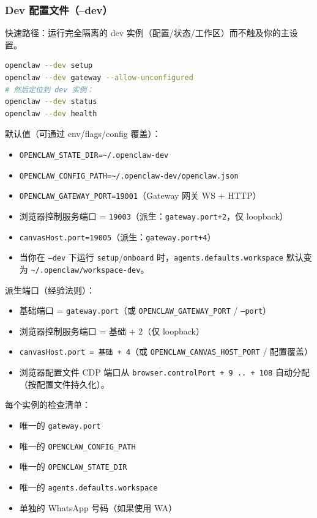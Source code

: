 \subsubsection{Dev 配置文件（--dev）}


快速路径：运行完全隔离的 dev 实例（配置/状态/工作区）而不触及你的主设置。

\begin{lstlisting}[language=bash]
openclaw --dev setup
openclaw --dev gateway --allow-unconfigured
# 然后定位到 dev 实例：
openclaw --dev status
openclaw --dev health
\end{lstlisting}


默认值（可通过 env/flags/config 覆盖）：

\begin{itemize}
  \item \texttt{OPENCLAW\_STATE\_DIR=\textasciitilde{}/.openclaw-dev}
  \item \texttt{OPENCLAW\_CONFIG\_PATH=\textasciitilde{}/.openclaw-dev/openclaw.json}
  \item \texttt{OPENCLAW\_GATEWAY\_PORT=19001}（Gateway 网关 WS + HTTP）
  \item 浏览器控制服务端口 = \texttt{19003}（派生：\texttt{gateway.port+2}，仅 loopback）
  \item \texttt{canvasHost.port=19005}（派生：\texttt{gateway.port+4}）
  \item 当你在 \texttt{--dev} 下运行 \texttt{setup}/\texttt{onboard} 时，\texttt{agents.defaults.workspace} 默认变为 \texttt{\textasciitilde{}/.openclaw/workspace-dev}。
\end{itemize}


派生端口（经验法则）：

\begin{itemize}
  \item 基础端口 = \texttt{gateway.port}（或 \texttt{OPENCLAW\_GATEWAY\_PORT} / \texttt{--port}）
  \item 浏览器控制服务端口 = 基础 + 2（仅 loopback）
  \item \texttt{canvasHost.port = 基础 + 4}（或 \texttt{OPENCLAW\_CANVAS\_HOST\_PORT} / 配置覆盖）
  \item 浏览器配置文件 CDP 端口从 \texttt{browser.controlPort + 9 .. + 108} 自动分配（按配置文件持久化）。
\end{itemize}


每个实例的检查清单：

\begin{itemize}
  \item 唯一的 \texttt{gateway.port}
  \item 唯一的 \texttt{OPENCLAW\_CONFIG\_PATH}
  \item 唯一的 \texttt{OPENCLAW\_STATE\_DIR}
  \item 唯一的 \texttt{agents.defaults.workspace}
  \item 单独的 WhatsApp 号码（如果使用 WA）
\end{itemize}


